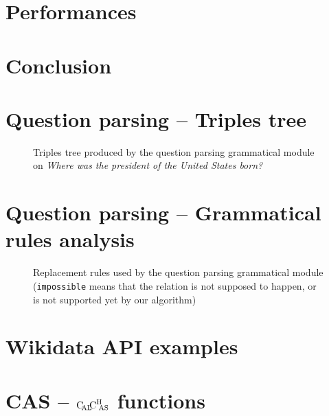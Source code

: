 \documentclass[a4paper,10pt]{report}
\begin{document}
\chapter{Performances}
    \label{performances}
    

\chapter*{Conclusion}
    \label{conclusion}
    



\nocite{*}

\appendix

\chapter{Question parsing \--- Triples tree}

\begin{figure}[!ht]

\caption{Triples tree produced by the question parsing grammatical module on \textit{Where was the president of the United States born?}}
\label{triple_tree}
\end{figure}

\chapter{Question parsing \--- Grammatical rules analysis}

\begin{figure}[!ht]

\caption{Replacement rules used by the question parsing grammatical module (\texttt{impossible} means that the relation is not supposed to happen, or is not supported yet by our algorithm)}
\label{gramm_rule}
\end{figure}

\chapter{Wikidata API examples}


\chapter{CAS \--- \texorpdfstring{$\text{C}\hspace{-2pt}_{\text{AL}}\hspace{-3pt}\text{C}^{\text{H}}{\hspace{-4pt}}_\text{AS}$}{CalChAS} functions}
    
\end{document}

